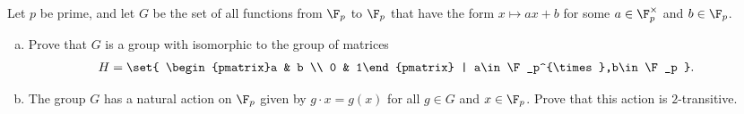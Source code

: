 \documentclass[10pt]{mypackage}
\begin{document}
\begin{problem}[Problem 2]
  Let $p$ be prime, and let $G$ be the set of all functions from $\F_p$ to $\F_p$ that have the form $x\mapsto ax + b$ for some $a\in \F_p^{\times}$ and $b\in \F_p$.
  \begin{enumerate}[(a)]
    \item Prove that $G$ is a group with isomorphic to the group of matrices
      \begin{align*}
        H &= \set{ \begin{pmatrix}a & b \\ 0 & 1\end{pmatrix} | a\in \F_p^{\times},b\in \F_p }.
      \end{align*}
    \item The group $G$ has a natural action on $\F_p$ given by $g\cdot x = g(x)$ for all $g\in G$ and $x\in \F_p$. Prove that this action is $2$-transitive.
  \end{enumerate}
\end{problem}
\end{document}
